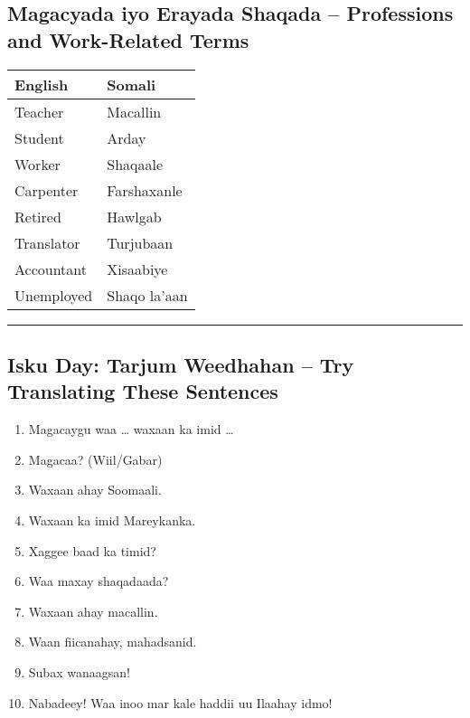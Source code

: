 \documentclass[
  a4paper,
  DIV=11,
  numbers=noendperiod]{scrartcl}
\providecommand{\tightlist}{%
  \setlength{\itemsep}{0pt}\setlength{\parskip}{0pt}}
\begin{document}
\subsection{Magacyada iyo Erayada Shaqada -- Professions and
Work-Related
Terms}\label{magacyada-iyo-erayada-shaqada-professions-and-work-related-terms}

\begin{longtable}[]{@{}ll@{}}
\toprule\noalign{}
English & Somali \\
\midrule\noalign{}
\endhead
\bottomrule\noalign{}
\endlastfoot
Teacher & Macallin \\
Student & Arday \\
Worker & Shaqaale \\
Carpenter & Farshaxanle \\
Retired & Hawlgab \\
Translator & Turjubaan \\
Accountant & Xisaabiye \\
Unemployed & Shaqo la'aan \\
\end{longtable}

\begin{center}\rule{0.5\linewidth}{0.5pt}\end{center}

\subsection{Isku Day: Tarjum Weedhahan -- Try Translating These
Sentences}\label{isku-day-tarjum-weedhahan-try-translating-these-sentences}

\begin{enumerate}
\def\labelenumi{\arabic{enumi}.}
\tightlist
\item
  Magacaygu waa \ldots{} waxaan ka imid \ldots{}
\item
  Magacaa? (Wiil/Gabar)
\item
  Waxaan ahay Soomaali.
\item
  Waxaan ka imid Mareykanka.
\item
  Xaggee baad ka timid?
\item
  Waa maxay shaqadaada?
\item
  Waxaan ahay macallin.
\item
  Waan fiicanahay, mahadsanid.
\item
  Subax wanaagsan!
\item
  Nabadeey! Waa inoo mar kale haddii uu Ilaahay idmo!
\end{enumerate}
\end{document}
